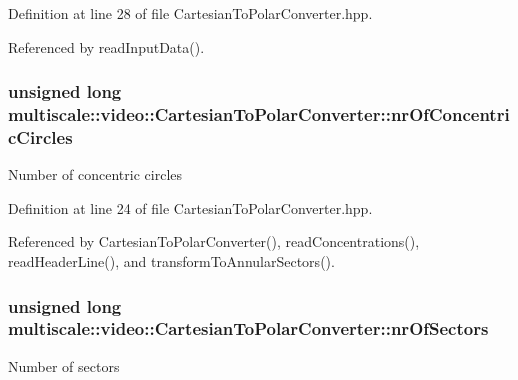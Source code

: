 \-Definition at line 28 of file \-Cartesian\-To\-Polar\-Converter.\-hpp.



\-Referenced by read\-Input\-Data().

\hypertarget{classmultiscale_1_1video_1_1CartesianToPolarConverter_ab7c8564deaa38c57a251ba9592903238}{
\subsubsection[{nr\-Of\-Concentric\-Circles}]{\setlength{\rightskip}{0pt plus 5cm}unsigned long {\bf multiscale\-::video\-::\-Cartesian\-To\-Polar\-Converter\-::nr\-Of\-Concentric\-Circles}}}\label{classmultiscale_1_1video_1_1CartesianToPolarConverter_ab7c8564deaa38c57a251ba9592903238}
\-Number of concentric circles 

\-Definition at line 24 of file \-Cartesian\-To\-Polar\-Converter.\-hpp.



\-Referenced by \-Cartesian\-To\-Polar\-Converter(), read\-Concentrations(), read\-Header\-Line(), and transform\-To\-Annular\-Sectors().

\hypertarget{classmultiscale_1_1video_1_1CartesianToPolarConverter_a62a2f5abe655f440e7c41fe834f828d0}{
\subsubsection[{nr\-Of\-Sectors}]{\setlength{\rightskip}{0pt plus 5cm}unsigned long {\bf multiscale\-::video\-::\-Cartesian\-To\-Polar\-Converter\-::nr\-Of\-Sectors}}}\label{classmultiscale_1_1video_1_1CartesianToPolarConverter_a62a2f5abe655f440e7c41fe834f828d0}
\-Number of sectors 

